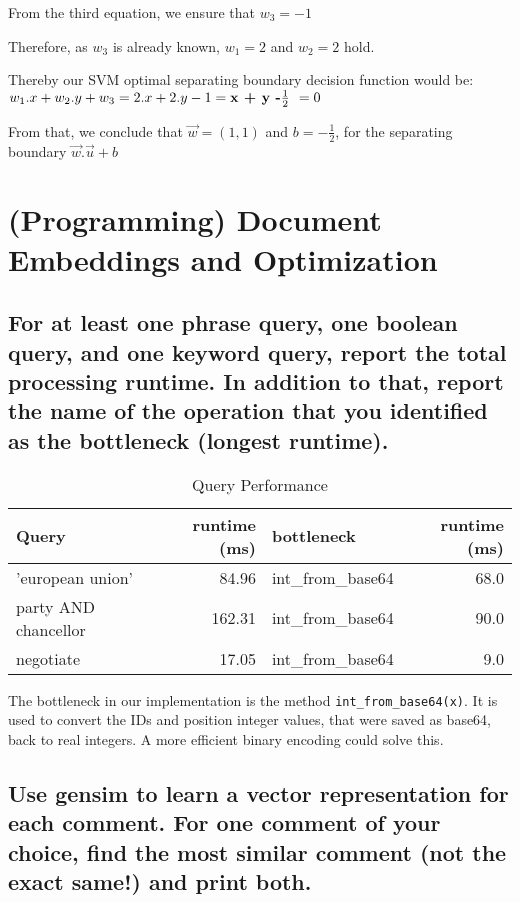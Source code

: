 \documentclass{scrartcl}
\begin{document}
From the third equation, we ensure that $w_3 = -1$

Therefore, as $w_3$ is already known, $w_1 = 2$ and $w_2 = 2$ hold.

Thereby our SVM optimal separating boundary decision function would be: $w_1 . x+ w_2 . y + w_3 = 2.x + 2.y - 1 = \textbf{x + y -$ \frac{1}{2}$ } = 0 $

From that, we conclude that $\vec{w} = (1,1) $ and $b =  - \frac{1}{2}$, for the separating boundary $\vec{w} . \vec{u} +b $ 


\section{(Programming) Document Embeddings and Optimization}

\subsection{For at least one phrase query, one boolean query, and one keyword query, report the total processing runtime. In addition to that, report the name of the operation that you identified as the bottleneck (longest runtime).}

\begin{table}[h]
	\centering
	\caption{Query Performance}
	\begin{tabular}{l|r|l|r}
		Query                & runtime (ms) & bottleneck         & runtime (ms)  \\ \hline
		'european union'     &        84.96 & int\_from\_base64  & 68.0  \\
		party AND chancellor &       162.31 & int\_from\_base64  & 90.0  \\
		negotiate            &        17.05 & int\_from\_base64  &  9.0  \\
	\end{tabular}
\end{table}

The bottleneck in our implementation is the method \texttt{int\_from\_base64(x)}. It is used to convert the IDs and position integer values, that were saved as base64, back to real integers. A more efficient binary encoding could solve this.

\subsection{Use gensim to learn a vector representation for each comment. For one comment of your choice, find the most similar comment (not the exact same!) and print both.}
\end{document}
